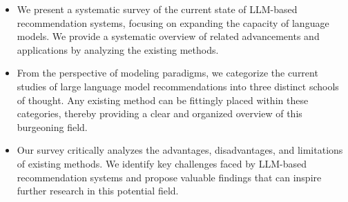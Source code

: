 \documentclass[sn-mathphys-num]{sn-jnl}%
\theoremstyle{thmstyleone}%
\theoremstyle{thmstyletwo}%
\theoremstyle{thmstylethree}%
\begin{document}
\begin{itemize}
\item We present a systematic survey of the current state of LLM-based recommendation systems, focusing on expanding the capacity of language models. We provide a systematic overview of related advancements and applications by analyzing the existing methods.
\item From the perspective of modeling paradigms, we categorize the current studies of large language model recommendations into three distinct schools of thought. Any existing method can be fittingly placed within these categories, thereby providing a clear and organized overview of this burgeoning field.
\item Our survey critically analyzes the advantages, disadvantages, and limitations of existing methods. We identify key challenges faced by LLM-based recommendation systems and propose valuable findings that can inspire further research in this potential field. 
\end{itemize}
\end{document}
